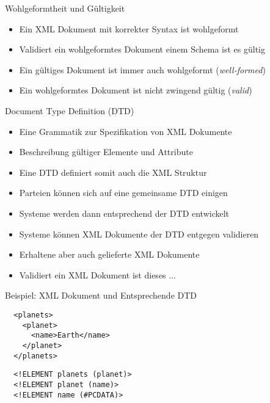 \documentclass{beamer}
\begin{document}
\begin{frame}{Wohlgeformtheit und Gültigkeit}
	
	\begin{itemize}
		\item Ein XML Dokument mit korrekter Syntax ist wohlgeformt
		\item Validiert ein wohlgeformtes Dokument einem Schema ist es gültig
		\item Ein gültiges Dokument ist immer auch wohlgeformt (\emph{well-formed})
		\item Ein wohlgeformtes Dokument ist nicht zwingend gültig (\emph{valid})
	\end{itemize}
	
\end{frame}

\begin{frame}{Document Type Definition (DTD)}
	
	\begin{itemize}
		\item Eine Grammatik zur Spezifikation von XML Dokumente
		\item Beschreibung gültiger Elemente und Attribute
		\item Eine DTD definiert somit auch die XML Struktur
		\item Parteien können sich auf eine gemeinsame DTD einigen
		\item Systeme werden dann entsprechend der DTD entwickelt
		\item Systeme können XML Dokumente der DTD entgegen validieren
		\item Erhaltene aber auch gelieferte XML Dokumente
		\item Validiert ein XML Dokument ist dieses ...
	\end{itemize}
	
\end{frame}

\begin{frame}[fragile]{Beispiel: XML Dokument und Entsprechende DTD}
	
	\lstset{language=XML}
	\begin{lstlisting}	
  <planets>
    <planet>
      <name>Earth</name>
    </planet>
  </planets>		
	\end{lstlisting}
	
	\vspace{1cm}
	  	
	\begin{lstlisting}	
  <!ELEMENT planets (planet)>
  <!ELEMENT planet (name)>
  <!ELEMENT name (#PCDATA)>
	\end{lstlisting}
	
\end{frame}
\end{document}
